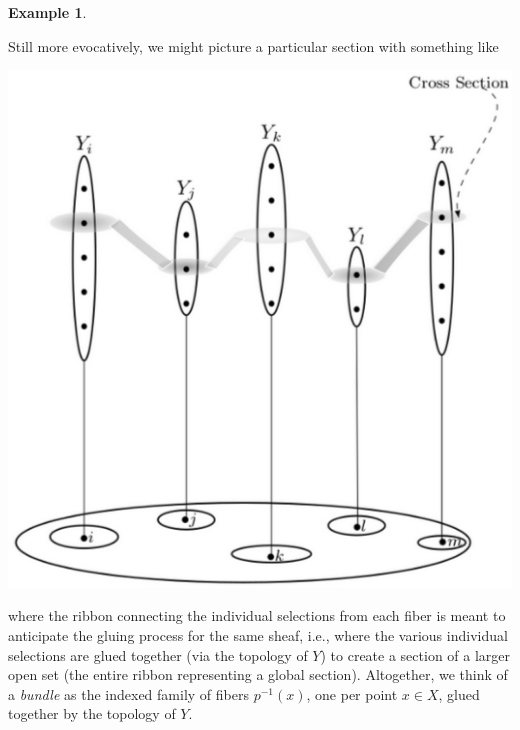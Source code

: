 \documentclass[a4paper]{book}
\theoremstyle{definition}
\newtheorem{example}{Example}[section]
\theoremstyle{definition}
\theoremstyle{definition}
\theoremstyle{theorem}
\theoremstyle{definition}
\begin{document}
\begin{example}
\begin{center}
\end{center}
Still more evocatively, we might picture a particular section with something like 
\begin{center}
	\includegraphics[scale=0.35]{CrossSectionBW.png}
\end{center}
where the ribbon connecting the individual selections from each fiber is meant to anticipate the gluing process for the same sheaf, i.e., where the various individual selections are glued together (via the topology of $Y$) to create a section of a larger open set (the entire ribbon representing a global section). Altogether, we think of a \textit{bundle} as the indexed family of fibers $p^{-1}(x)$, one per point $x \in X$, glued together by the topology of $Y$. 

\end{example}
\end{document}
